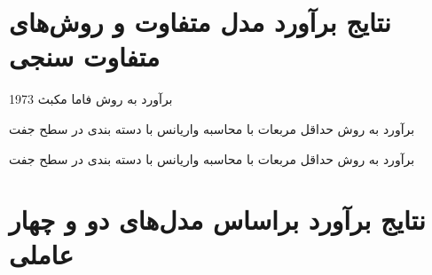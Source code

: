 \documentclass[12pt]{article}
\begin{document}
 





\FloatBarrier


\newpage
\linespread{1.2}
\begin{appendices}


\section{نتایج برآورد مدل متفاوت و روش‌های متفاوت سنجی}




\label{sa.1}
 
 
 
 
 
   \begin{table}[htbp]
   \centering
   \begin{LTR}
   \lr{
      \resizebox{\textwidth}{!}{
      
      }
      }
   \end{LTR}
   \caption{برآورد به روش فاما مکبث 1973}
   \label{t15}
   \end{table}
 
 
 
 \begin{table}[htbp]
 \centering
 \begin{LTR}
 \lr{
    \resizebox{\textwidth}{!}{
    
    }
    }
 \end{LTR}
 \caption{برآورد به روش حداقل مربعات با محاسبه واریانس با دسته بندی در سطح جفت}
 \label{t8}
 \end{table}
 
  \begin{table}[htbp]
  \centering
  \begin{LTR}
  \lr{
     \resizebox{\textwidth}{!}{
     
     }
     }
  \end{LTR}
  \caption{برآورد به روش حداقل مربعات با محاسبه واریانس با دسته بندی در سطح جفت}
  \label{t13}
  \end{table}
 
 
  
 \FloatBarrier
 

\section{نتایج برآورد براساس مدل‌های دو و چهار عاملی}
\label{sa.3}

\end{appendices}
\end{document}

